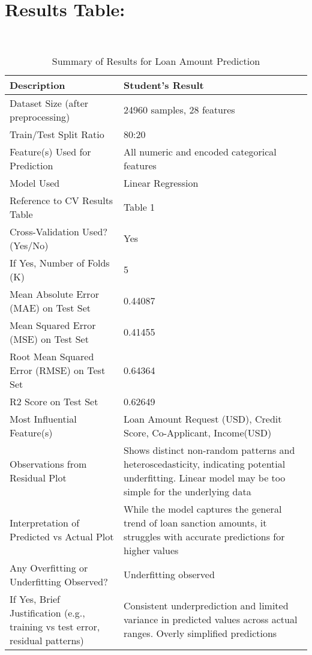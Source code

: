 \documentclass[11pt]{article}
\begin{document}
\section{Results Table:} \\
\begin{table}[H]
\centering
\begin{tabular}{|p{}|p{}|}
\hline
\textbf{Description} & \textbf{Student's Result} \\
\hline
Dataset Size (after preprocessing) &  24960 samples, 28 features

\\ 
\hline
Train/Test Split Ratio & 80:20 

\\ 
\hline
Feature(s) Used for Prediction &  All numeric and encoded categorical features

\\ 
\hline
Model Used & Linear Regression 

\\ 
\hline
Reference to CV Results Table & Table 1 

\\ 
\hline
Cross-Validation Used? (Yes/No) &  Yes

\\ 
\hline
If Yes, Number of Folds (K) &  5 

\\ 
\hline
Mean Absolute Error (MAE) on Test Set &  0.44087

\\ 
\hline
Mean Squared Error (MSE) on Test Set &  0.41455

\\ 
\hline
Root Mean Squared Error (RMSE) on Test Set &  0.64364\\ 
\hline
R2 Score on Test Set &  0.62649

\\ 
\hline
Most Influential Feature(s) & Loan Amount Request (USD), Credit Score, Co-Applicant, Income(USD) 

\\ 
\hline
Observations from Residual Plot &  Shows distinct non-random patterns and heteroscedasticity, indicating potential underfitting. Linear model may be too simple for the underlying data

\\ 
\hline
Interpretation of Predicted vs Actual Plot & While the model captures the general trend of loan sanction amounts, it struggles with accurate predictions for higher values 

\\ 
\hline
Any Overfitting or Underfitting Observed? &  Underfitting observed

\\ 
\hline
If Yes, Brief Justification (e.g., training vs test error, residual patterns) &  Consistent underprediction and limited variance in predicted values across actual ranges. Overly simplified predictions

\\ 
\hline
\end{tabular}
\caption{Summary of Results for Loan Amount Prediction}
\end{table}
\end{document}
